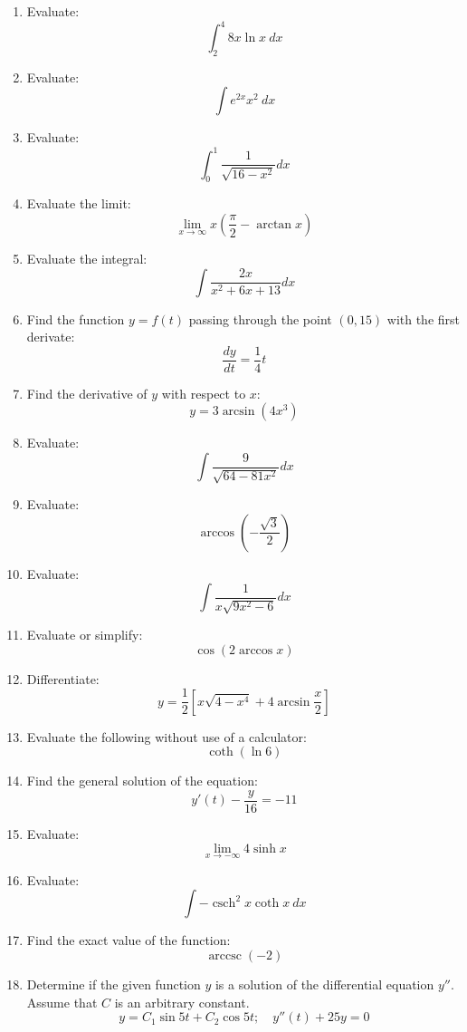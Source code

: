 \documentclass[fleqn]{article}
\DeclareMathOperator{\arccsc}{arccsc}
\DeclareMathOperator{\csch}{csch}
\begin{document}
\begin{multicols}{2}
\begin{enumerate}
\item Evaluate:
\[\int_2^4 8x\ln x\ dx\]

\item Evaluate:
\[\int e^{2x}x^2\ dx\]

\item Evaluate:
\[\int_0^1\frac{1}{\sqrt{16-x^2}}dx\]

\item Evaluate the limit:
\[\lim_{x\to\infty}x\left(\frac{\pi}{2}-\arctan x\right)\]

\item Evaluate the integral:
\[\int\frac{2x}{x^2+6x+13}dx\]

\item Find the function \(y=f(t)\) passing through the point \((0,15)\) with the first derivate:
\[\frac{dy}{dt}=\frac{1}{4}t\]

\item Find the derivative of \(y\) with respect to \(x\):
\[y=3\arcsin(4x^3)\]

\item Evaluate:
\[\int\frac{9}{\sqrt{64-81x^2}}dx\]

\item Evaluate:
\[\arccos\left(-\frac{\sqrt{3}}{2}\right)\]

\item Evaluate:
\[\int\frac{1}{x\sqrt{9x^2-6}}dx\]

\item Evaluate or simplify:
\[\cos(2\arccos x)\]

\item Differentiate:
\[y=\frac{1}{2}\left[x\sqrt{4-x^4}+4\arcsin\frac{x}{2}\right]\]

\item Evaluate the following without use of a calculator:
\[\coth(\ln 6)\]

\item Find the general solution of the equation:
\[y'(t)-\frac{y}{16}=-11\]

\item Evaluate:
\[\lim_{x\to-\infty}4\sinh x\]

\item Evaluate:
\[\int-\csch^2 x\coth x\ dx\]

\item Find the exact value of the function:
\[\arccsc(-2)\]

\item Determine if the given function \(y\) is a solution of the differential equation \(y''\). Assume that \(C\) is an arbitrary constant.
\[y=C_1\sin 5t+C_2\cos 5t;\quad y''(t)+25y=0\]


\end{enumerate}
\end{multicols}
\end{document}
